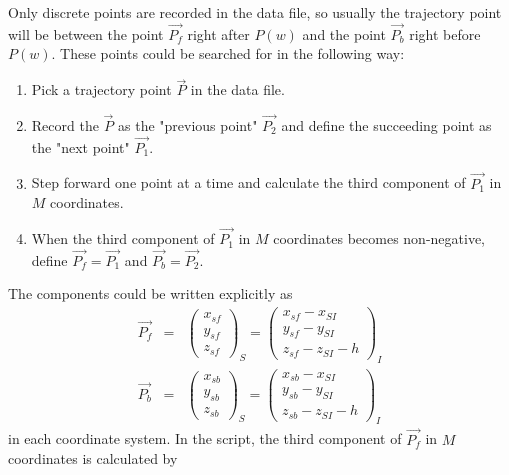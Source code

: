 \documentclass{article}
\begin{document}
Only discrete points are recorded in the data file, so usually the trajectory point will be between the point $\vec{P_f}$ right after $P(w)$ and the point $\vec{P_b}$ right before $P(w)$. These points could be searched for in the following way:
\begin{enumerate}
	\item Pick a trajectory point $\vec{P}$ in the data file.
	\item Record the $\vec{P}$ as the "previous point" $\vec{P_2}$ and define the succeeding point as the "next point" $\vec{P_1}$.
	\item Step forward one point at a time and calculate the third component of $\vec{P_1}$ in $M$ coordinates.
	\item When the third component of $\vec{P_1}$ in $M$ coordinates becomes non-negative, define $\vec{P_f} = \vec{P_1}$ and $\vec{P_b} = \vec{P_2}$.
\end{enumerate}
The components could be written explicitly as
\begin{eqnarray*}
\vec{P_f} & = & \left(
\begin{array}{c}
	x_{sf} \\
	y_{sf} \\
	z_{sf}
\end{array} \right)_S = \left(
\begin{array}{c}
	x_{sf} - x_{SI} \\
	y_{sf} - y_{SI} \\
	z_{sf} - z_{SI} - h
\end{array} \right)_I \\
\vec{P_b} & = & \left(
\begin{array}{c}
	x_{sb} \\
	y_{sb} \\
	z_{sb}
\end{array} \right)_S = \left(
\begin{array}{c}
	x_{sb} - x_{SI} \\
	y_{sb} - y_{SI} \\
	z_{sb} - z_{SI} - h
\end{array} \right)_I
\end{eqnarray*}
in each coordinate system. In the script, the third component of $\vec{P_f}$ in $M$ coordinates is calculated by
\end{document}
